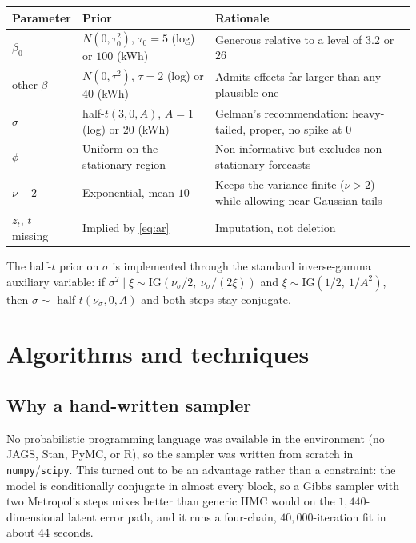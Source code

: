 \documentclass[11pt]{article}
\newcommand{\code}[1]{\texttt{\small #1}}
\begin{document}
\begin{center}
\small
\begin{tabular}{@{}p{}p{}p{}@{}}
\toprule
Parameter & Prior & Rationale \\
\midrule
$\beta_0$ & $N(0,\tau_0^2)$, $\tau_0 = 5$ (log) or $100$ (kWh)
  & Generous relative to a level of $3.2$ or $26$ \\
other $\beta$ & $N(0,\tau^2)$, $\tau = 2$ (log) or $40$ (kWh)
  & Admits effects far larger than any plausible one \\
$\sigma$ & half-$t(3, 0, A)$, $A = 1$ (log) or $20$ (kWh)
  & Gelman's recommendation: heavy-tailed, proper, no spike at $0$ \\
$\phi$ & Uniform on the stationary region
  & Non-informative but excludes non-stationary forecasts \\
$\nu - 2$ & Exponential, mean $10$
  & Keeps the variance finite ($\nu>2$) while allowing near-Gaussian tails \\
$z_t$, $t$ missing & Implied by \eqref{eq:ar}
  & Imputation, not deletion \\
\bottomrule
\end{tabular}
\end{center}

The half-$t$ prior on $\sigma$ is implemented through the standard
inverse-gamma auxiliary variable: if
$\sigma^2\mid\xi \sim \mathrm{IG}(\nu_\sigma/2,\ \nu_\sigma/(2\xi))$ and
$\xi \sim \mathrm{IG}(1/2,\ 1/A^2)$, then $\sigma \sim$ half-$t(\nu_\sigma,0,A)$
and both steps stay conjugate.

\section{Algorithms and techniques}

\subsection{Why a hand-written sampler}

No probabilistic programming language was available in the environment (no
JAGS, Stan, PyMC, or R), so the sampler was written from scratch in
\code{numpy}/\code{scipy}. This turned out to be an advantage rather than a
constraint: the model is conditionally conjugate in almost every block, so a
Gibbs sampler with two Metropolis steps mixes better than generic HMC would on
the $1{,}440$-dimensional latent error path, and it runs a four-chain,
$40{,}000$-iteration fit in about 44 seconds.
\end{document}

